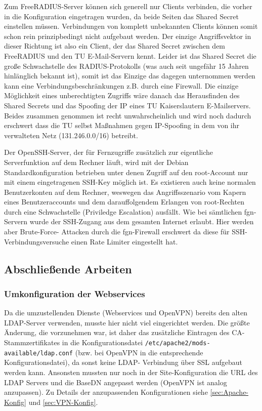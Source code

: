 \documentclass[11pt,a4paper,titlepage=firstiscover,headsepline,bibtotoc]{scrartcl} %
\newcommand{\hilight}[1]{\colorbox{yellow}{#1}} %
\begin{document}
Zum FreeRADIUS-Server können sich generell nur Clients verbinden, die vorher in die Konfiguration eingetragen wurden, da beide Seiten das Shared Secret einstellen müssen. Verbindungen von komplett unbekannten Clients können somit schon rein prinzipbedingt nicht aufgebaut werden. Der einzige Angriffsvektor in dieser Richtung ist also ein Client, der das Shared Secret zwischen dem FreeRADIUS und den TU E-Mail-Servern kennt. Leider ist das Shared Secret die große Schwachstelle des RADIUS-Protokolls (was auch seit ungefähr 15 Jahren hinlänglich bekannt ist), somit ist das Einzige das dagegen unternommen werden kann eine Verbindungsbeschränkungen z.B. durch eine Firewall. Die einzige Möglichkeit eines unberechtigten Zugriffs wäre danach das Herausfinden des Shared Secrets und das Spoofing der IP eines TU Kaiserslautern E-Mailservers. Beides zusammen genommen ist recht unwahrscheinlich und wird noch dadurch erschwert dass die TU selbst Maßnahmen gegen IP-Spoofing in dem von ihr verwalteten Netz (131.246.0.0/16) betreibt.

Der OpenSSH-Server, der für Fernzugriffe zusätzlich zur eigentliche Serverfunktion auf dem Rechner läuft, wird mit der Debian Standardkonfiguration betrieben unter denen Zugriff auf den root-Account nur mit einem eingetragenen SSH-Key möglich ist. Es existieren auch keine normalen Benutzerkonten auf dem Rechner, weswegen das Angriffsszenario vom Kapern eines Benutzeraccounts und dem darauffolgendem Erlangen von root-Rechten durch eine Schwachstelle (Priviledge Escalation) ausfällt. Wie bei sämtlichen fgn-Servern wurde der SSH-Zugang aus dem gesamten Internet erlaubt. Hier werden aber Brute-Force- Attacken durch die fgn-Firewall erschwert da diese für SSH-Verbindungsversuche einen Rate Limiter eingestellt hat.


\subsection{Abschließende Arbeiten}
\subsubsection{Umkonfiguration der Webservices}
Da die umzustellenden Dienste (Webservices und OpenVPN) bereits den alten LDAP-Server verwenden, musste hier nicht viel eingerichtet werden. Die größte Änderung, die vorzunehmen war, ist daher das zusätzliche Eintragen des CA-Stammzertifikates in die Konfigurationsdatei \texttt{/etc/apache2/mods-available/ldap.conf} (bzw. bei OpenVPN in die entsprechende Konfigurationsdatei), da sonst keine LDAP- Verbindung über SSL aufgebaut werden kann. Ansonsten mussten nur noch in der Site-Konfiguration die URL des LDAP Servers und die BaseDN angepasst werden (OpenVPN ist analog anzupassen). Zu Details der anzupassenden Konfigurationen siehe \autoref{sec:Apache-Konfig} und \autoref{sec:VPN-Konfig}.
\end{document}
